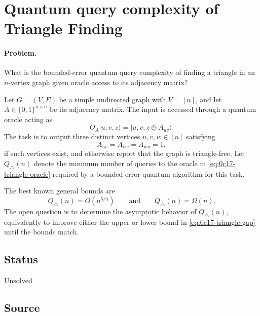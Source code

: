 \section{Quantum query complexity of Triangle Finding}
\label{sec:op_0c17d9fef967858d}

\paragraph{Problem.}
What is the bounded-error quantum query complexity of finding a triangle
in an $n$-vertex graph given oracle access to its adjacency matrix?

Let $G=(V,E)$ be a simple undirected graph with $V=[n]$, and let
$A\in\{0,1\}^{n\times n}$ be its adjacency matrix.  The input is accessed
through a quantum oracle acting as
\begin{equation}
  O_A\lvert u,v,z\rangle
  =\lvert u,v,z\oplus A_{uv}\rangle .
  \label{eq:0c17-triangle-oracle}
\end{equation}
The task is to output three distinct vertices $u,v,w\in[n]$ satisfying
\begin{equation}
  A_{uv}=A_{vw}=A_{wu}=1,
  \label{eq:0c17-triangle-certificate}
\end{equation}
if such vertices exist, and otherwise report that the graph is
triangle-free.  Let $Q_{\triangle}(n)$ denote the minimum number of queries
to the oracle in \eqref{eq:0c17-triangle-oracle} required by a
bounded-error quantum algorithm for this task.

The best known general bounds are
\begin{equation}
  Q_{\triangle}(n)=O\left(n^{5/4}\right)
  \qquad\text{and}\qquad
  Q_{\triangle}(n)=\Omega(n).
  \label{eq:0c17-triangle-gap}
\end{equation}
The open question is to determine the asymptotic behavior of
$Q_{\triangle}(n)$, equivalently to improve either the upper or lower bound
in \eqref{eq:0c17-triangle-gap} until the bounds match.

\subsection*{Status}

Unsolved

\subsection*{Source}

